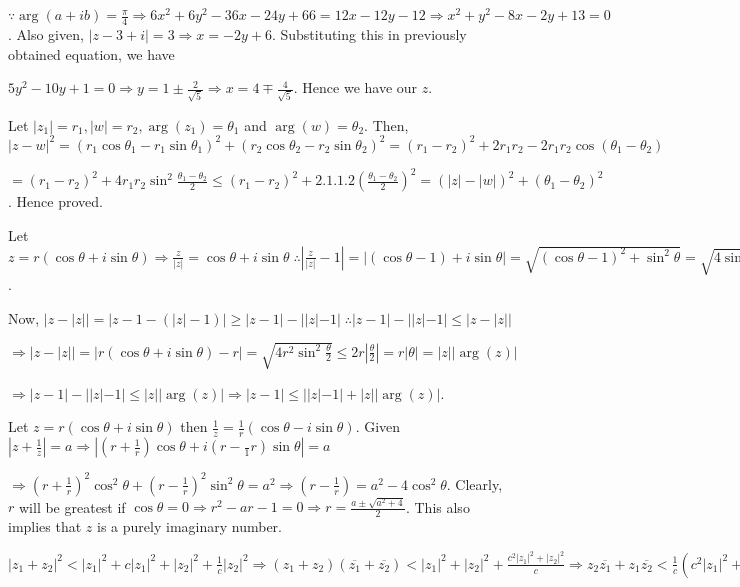   $\because\arg(a + ib) = \frac{\pi}{4} \Rightarrow 6x^2 + 6y^2 - 36x - 24y + 66 = 12x - 12y - 12
  \Rightarrow x^2 + y^2 - 8x - 2y + 13 = 0$. Also given, $|z - 3 + i| = 3 \Rightarrow x = -2y +
  6$. Substituting this in previously obtained equation, we have

  $5y^2 - 10y + 1 = 0 \Rightarrow y = 1 \pm\frac{2}{\sqrt{5}}\Rightarrow x = 4\mp\frac{4}{\sqrt{5}}$. Hence
  we have our $z$.
\item Let $|z_1| = r_1, |w| = r_2, \arg(z_1)= \theta_1$ and $\arg(w) = \theta_2$. Then, $|z - w|^2 =
  (r_1\cos\theta_1 - r_1\sin\theta_1)^2 + (r_2\cos\theta_2 - r_2\sin\theta_2)^2 = (r_1 - r_2)^2 + 2r_1r_2 -
  2r_1r_2\cos(\theta_1 - \theta_2)$

  $= (r_1 - r_2)^2 + 4r_1r_2\sin^2\frac{\theta_1 - \theta_2}{2}\leq (r_1 - r_2)^2 +
  2.1.1.2\left(\frac{\theta_1 - \theta_2}{2}\right)^2 = (|z| - |w|)^2 + (\theta_1 - \theta_2)^2$. Hence
  proved.
\item Let $z = r(\cos\theta + i\sin\theta) \Rightarrow \frac{z}{|z|}= \cos\theta + i\sin\theta\;\therefore
  \left|\frac{z}{|z|} - 1\right| = |(\cos\theta - 1) + i\sin\theta| = \sqrt{(\cos\theta - 1)^2 +
    \sin^2\theta} = \sqrt{4\sin^2\frac{\theta}{2}} = 2|\sin\frac{\theta}{2}|\leq |\theta|$.

  Now, $|z - |z|| = |z - 1 - (|z| - 1)|\geq |z - 1| - ||z| - 1|\;\therefore |z - 1| - ||z| - 1|\leq |z -
  |z||$

  $\Rightarrow |z - |z|| = |r(\cos\theta + i\sin\theta) - r| = \sqrt{4r^2\sin^2\frac{\theta}{2}}\leq
  2r\left|\frac{\theta}{2}\right| = r|\theta| = |z||\arg(z)|$

  $\Rightarrow |z - 1| - ||z| - 1|\leq |z||\arg(z)|\Rightarrow |z - 1|\leq ||z| - 1| + |z||\arg(z)|$.
\item Let $z = r(\cos\theta + i\sin\theta)$ then $\frac{1}{z} = \frac{1}{r}(\cos\theta -
  i\sin\theta)$. Given $\left|z + \frac{1}{z}\right| = a \Rightarrow \left|\left(r +
  \frac{1}{r}\right)\cos\theta + i\left(r - \frac{}1{r}\right)\sin\theta\right| = a$

  $\Rightarrow \left(r + \frac{1}{r}\right)^2\cos^2\theta + \left(r - \frac{1}{r}\right)^2\sin^2\theta =
  a^2 \Rightarrow \left(r - \frac{1}{r}\right) = a^2 - 4\cos^2\theta$. Clearly, $r$ will be greatest if
  $\cos\theta = 0 \Rightarrow r^2 - ar - 1 = 0 \Rightarrow r = \frac{a \pm\sqrt{a^2 + 4}}{2}$. This also
  implies that $z$ is a purely imaginary number.
\item $|z_1 + z_2|^2 < |z_1|^2 + c|z_1|^2 + |z_2|^2 + \frac{1}{c}|z_2|^2 \Rightarrow (z_1 +
  z_2)(\overline{z_1} + \overline{z_2}) < |z_1|^2 + |z_2|^2 + \frac{c^2|z_1|^2 + |z_2|^2}{c} \Rightarrow
  z_2\overline{z_1} + z_1\overline{z_2} < \frac{1}{c}(c^2|z_1|^2 + |z_2|^2)$

